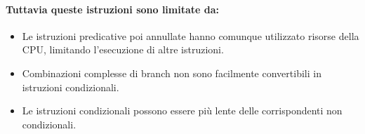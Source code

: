 \paragraph{Tuttavia queste istruzioni sono limitate da:}

\begin{itemize}
  \item Le istruzioni predicative poi annullate hanno comunque utilizzato
risorse della CPU, limitando l’esecuzione di altre istruzioni.
\item Combinazioni complesse di branch non sono facilmente
convertibili in istruzioni condizionali. 
\item Le istruzioni condizionali possono essere più lente delle
corrispondenti non condizionali.
\end{itemize}







